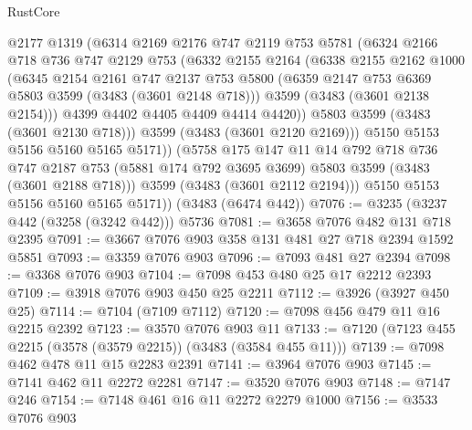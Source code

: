 \begin{lexlean}{RustCore}
\begin{coremodule}
              @2177
              @1319
              (@6314
                @2169
                @2176
                @747
                @2119
                @753
                @5781
                (@6324
                  @2166
                  @718
                  @736
                  @747
                  @2129
                  @753
                  (@6332
                    @2155
                    @2164
                    (@6338
                      @2155
                      @2162
                      @1000
                      (@6345
                        @2154
                        @2161
                        @747
                        @2137
                        @753
                        @5800
                        (@6359 @2147 @753 @6369 @5803 @3599 (@3483 (@3601 @2148 @718)))
                        @3599
                        (@3483 (@3601 @2138 @2154)))
                      @4399
                      @4402
                      @4405
                      @4409
                      @4414
                      @4420))
                  @5803
                  @3599
                  (@3483 (@3601 @2130 @718)))
                @3599
                (@3483 (@3601 @2120 @2169)))
              @5150
              @5153
              @5156
              @5160
              @5165
              @5171))
          (@5758
            @175
            @147
            @11
            @14
            @792
            @718
            @736
            @747
            @2187
            @753
            (@5881 @174 @792 @3695 @3699)
            @5803
            @3599
            (@3483 (@3601 @2188 @718)))
          @3599
          (@3483 (@3601 @2112 @2194)))
        @5150
        @5153
        @5156
        @5160
        @5165
        @5171))
    (@3483 (@6474 @442))
@7076 := @3235 (@3237 @442 (@3258 (@3242 @442))) @5736
@7081 := @3658 @7076 @482 @131 @718 @2395
@7091 := @3667 @7076 @903 @358 @131 @481 @27 @718 @2394 @1592 @5851
@7093 := @3359 @7076 @903
@7096 := @7093 @481 @27 @2394
@7098 := @3368 @7076 @903
@7104 := @7098 @453 @480 @25 @17 @2212 @2393
@7109 := @3918 @7076 @903 @450 @25 @2211
@7112 := @3926 (@3927 @450 @25)
@7114 := @7104 (@7109 @7112)
@7120 := @7098 @456 @479 @11 @16 @2215 @2392
@7123 := @3570 @7076 @903 @11
@7133 := @7120 (@7123 @455 @2215 (@3578 (@3579 @2215)) (@3483 (@3584 @455 @11)))
@7139 := @7098 @462 @478 @11 @15 @2283 @2391
@7141 := @3964 @7076 @903
@7145 := @7141 @462 @11 @2272 @2281
@7147 := @3520 @7076 @903
@7148 := @7147 @246
@7154 := @7148 @461 @16 @11 @2272 @2279 @1000
@7156 := @3533 @7076 @903

\end{coremodule}
\end{lexlean}
